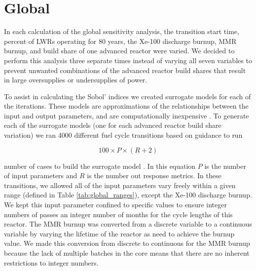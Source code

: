 
\section{Global}
In each calculation of the global sensitivity analysis, the transition start 
time, percent of \glspl{LWR} operating for 80 years, the Xe-100 discharge 
burnup, \gls{MMR} burnup, and build share of one advanced reactor were 
varied. We decided to perform this analysis three separate times instead of 
varying all seven variables to prevent unwanted combinations of the 
advanced reactor build shares that result in large oversupplies or 
undersupplies of power. 

To assist in calculating the Sobol' indices we created surrogate 
models for each of the iterations. These models are approximations 
of the relationships between the input and output parameters, and 
are computationally inexpensive \cite{adams_dakota_2021}. To generate 
each of the surrogate models (one for each advanced reactor build share 
variation) we ran 4000 different fuel cycle transitions based on guidance 
to run 

\begin{equation}
    100\times P\times(R+2)
\end{equation}

number of cases to build the surrogate model \cite{adams_dakota_2021}. In this 
equation $P$ is the number of input parameters and $R$ is the number out response 
metrics. In these
transitions, we allowed all of the input parameters vary freely 
within a given range (defined in Table \ref{tab:global_ranges}), except 
the Xe-100 discharge burnup. We kept this input parameter confined to 
specific values to ensure integer numbers of passes an integer number of 
months for the cycle lengths of this reactor. The \gls{MMR} burnup 
was converted from a discrete variable to a continuous variable by varying 
the lifetime of the reactor as need to achieve the burnup value. We made 
this conversion from discrete to continuous for the \gls{MMR} burnup 
because the lack of multiple batches in the core means that there are 
no inherent restrictions to integer numbers. 

